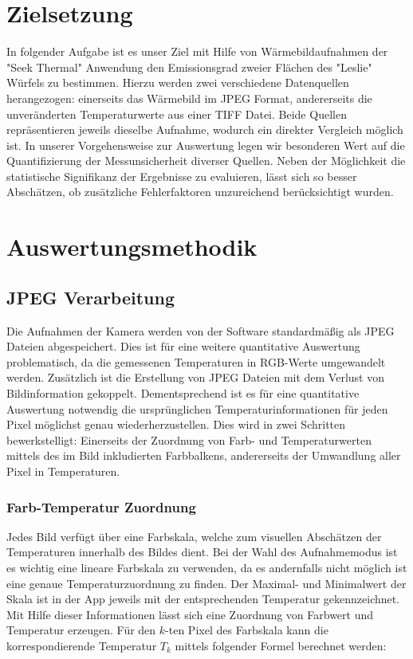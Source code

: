 \documentclass{article}
\begin{document}
\section{Zielsetzung}
In folgender Aufgabe ist es unser Ziel mit Hilfe von Wärmebildaufnahmen der "Seek Thermal" Anwendung den Emissionsgrad zweier Flächen des "Leslie" Würfels zu bestimmen.
Hierzu werden zwei verschiedene Datenquellen herangezogen: einerseits das Wärmebild im JPEG Format, andererseits die unveränderten Temperaturwerte aus einer TIFF Datei.
Beide Quellen repräsentieren jeweils dieselbe Aufnahme, wodurch ein direkter Vergleich möglich ist.
In unserer Vorgehensweise zur Auswertung legen wir besonderen Wert auf die Quantifizierung der Messunsicherheit diverser Quellen.
Neben der Möglichkeit die statistische Signifikanz der Ergebnisse zu evaluieren, lässt sich so besser Abschätzen, ob zusätzliche Fehlerfaktoren unzureichend berücksichtigt wurden.

\section{Auswertungsmethodik}
\subsection{JPEG Verarbeitung}
Die Aufnahmen der Kamera werden von der Software standardmäßig als JPEG Dateien abgespeichert.
Dies ist für eine weitere quantitative Auswertung problematisch, da die gemessenen Temperaturen in RGB-Werte umgewandelt werden.
Zusätzlich ist die Erstellung von JPEG Dateien mit dem Verlust von Bildinformation gekoppelt. 
Dementsprechend ist es für eine quantitative Auswertung notwendig die ursprünglichen Temperaturinformationen für jeden Pixel möglichst genau wiederherzustellen.
Dies wird in zwei Schritten bewerkstelligt:
Einerseits der Zuordnung von Farb- und Temperaturwerten mittels des im Bild inkludierten Farbbalkens, andererseits der Umwandlung aller Pixel in Temperaturen.

\subsubsection{Farb-Temperatur Zuordnung}

Jedes Bild verfügt über eine Farbskala, welche zum visuellen Abschätzen der Temperaturen innerhalb des Bildes dient.
Bei der Wahl des Aufnahmemodus ist es wichtig eine lineare Farbskala zu verwenden, da es andernfalls nicht möglich ist eine genaue Temperaturzuordnung zu finden.
Der Maximal- und Minimalwert der Skala ist in der App jeweils mit der entsprechenden Temperatur gekennzeichnet.
Mit Hilfe dieser Informationen lässt sich eine Zuordnung von Farbwert und Temperatur erzeugen.
Für den $k$-ten Pixel des Farbskala kann die korrespondierende Temperatur $T_{k}$ mittels folgender Formel berechnet werden:
\end{document}
